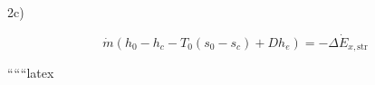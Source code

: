 2c)

\[
\dot{m} \left( h_0 - h_c - T_0 (s_0 - s_c) + D h_e \right) = - \Delta \dot{E}_{x, \text{str}}
\]

``````latex